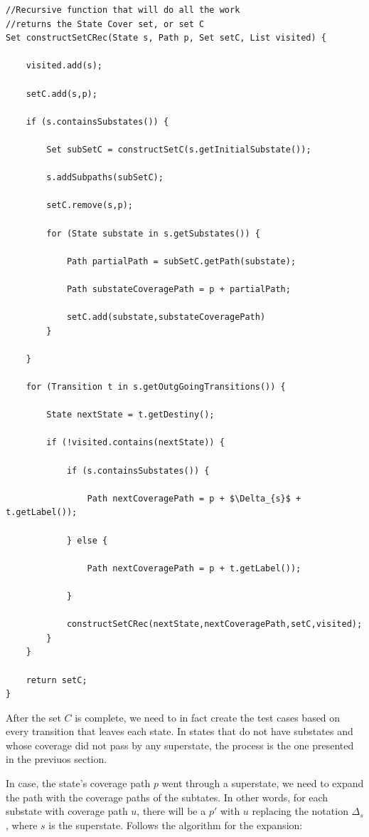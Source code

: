 \begin{lstlisting}[mathescape]
//Recursive function that will do all the work
//returns the State Cover set, or set C
Set constructSetCRec(State s, Path p, Set setC, List visited) {

	visited.add(s);

	setC.add(s,p);

	if (s.containsSubstates()) {

		Set subSetC = constructSetC(s.getInitialSubstate());	

		s.addSubpaths(subSetC);

		setC.remove(s,p);

		for (State substate in s.getSubstates()) {

			Path partialPath = subSetC.getPath(substate);

			Path substateCoveragePath = p + partialPath;

			setC.add(substate,substateCoveragePath)	
		}
		
	}
	
	for (Transition t in s.getOutgGoingTransitions()) {
		
		State nextState = t.getDestiny();

		if (!visited.contains(nextState)) {

			if (s.containsSubstates()) {
			
				Path nextCoveragePath = p + $\Delta_{s}$ + t.getLabel());

			} else {

				Path nextCoveragePath = p + t.getLabel());

			}	

			constructSetCRec(nextState,nextCoveragePath,setC,visited);	
		}
	}
	
	return setC;
}

\end{lstlisting}
 

After the set $C$ is complete, we need to in fact create the test cases based on every transition that leaves each state. In states that do not have substates and whose coverage did not pass by any superstate, the process is the one presented in the previuos section.

In case, the state's coverage path $p$ went through a superstate, we need to expand the path with the coverage paths of the subtates. In other words, for each substate with coverage path $u$,  there will be a $p'$ with $u$ replacing the notation $\Delta_s$, where $s$ is the superstate. Follows the algorithm for the expansion:

